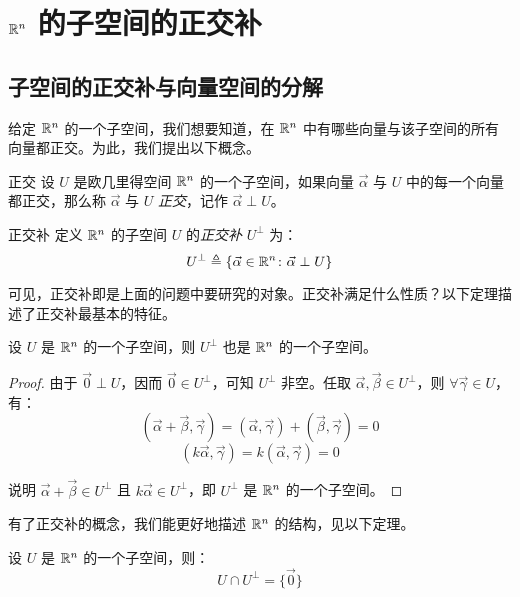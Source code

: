 
\section{$\mathbb R^n$ 的子空间的正交补}

\subsection{子空间的正交补与向量空间的分解}

给定 $\mathbb R^n$ 的一个子空间，我们想要知道，在 $\mathbb R^n$ 中有哪些向量与该子空间的所有向量都正交。为此，我们提出以下概念。

\begin{definition}{正交}
	设 $U$ 是欧几里得空间 $\mathbb R^n$ 的一个子空间，如果向量 $\vec \alpha$ 与 $U$ 中的每一个向量都正交，那么称 $\vec \alpha$ 与 $U$ \emph{正交}，记作 $\vec \alpha \perp U$。
\end{definition}

\begin{definition}{正交补}
	定义 $\mathbb R^n$ 的子空间 $U$ 的\emph{正交补} $U^\perp$ 为：
	$$
	U^\perp \triangleq \{ \vec \alpha \in \mathbb R^n \colon \vec \alpha \perp U \}
	$$
\end{definition}

可见，正交补即是上面的问题中要研究的对象。正交补满足什么性质？以下定理描述了正交补最基本的特征。

\begin{theorem}
	设 $U$ 是 $\mathbb R^n$ 的一个子空间，则 $U^\perp$ 也是 $\mathbb R^n$ 的一个子空间。
\end{theorem}

\begin{proof}
	由于 $\vec 0 \perp U$，因而 $\vec 0 \in U^\perp$，可知 $U^\perp$ 非空。任取 $\vec \alpha, \vec \beta \in U^\perp$，则 $\forall \vec \gamma \in U$，有：
	$$
	(\vec \alpha + \vec \beta, \vec \gamma) = (\vec \alpha, \vec \gamma) + (\vec \beta, \vec \gamma) = 0
	$$$$
	(k \vec \alpha, \vec \gamma) = k(\vec \alpha, \vec \gamma) = 0
	$$

	说明 $\vec \alpha + \vec \beta \in U^\perp$ 且 $k \vec \alpha \in U^\perp$，即 $U^\perp$ 是 $\mathbb R^n$ 的一个子空间。
\end{proof}

有了正交补的概念，我们能更好地描述 $\mathbb R^n$ 的结构，见以下定理。

\begin{theorem}
	设 $U$ 是 $\mathbb R^n$ 的一个子空间，则：
	$$
	U \cap U^\perp = \{ \vec 0\}
	$$
\end{theorem}

